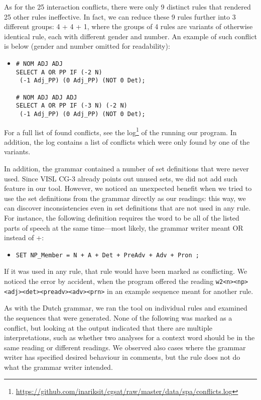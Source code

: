 As for the 25 interaction conflicts, there were only 9 distinct rules that rendered 25 other rules ineffective.
In fact, we can reduce these 9 rules further into 3 different groups: 4 + 4 + 1, where the groups of 4 rules are variants of otherwise identical rule, each with different gender and number.
An example of such conflict is below (gender and number omitted for readability):

\begin{itemize}
\item[] 
\begin{verbatim}
# NOM ADJ ADJ
SELECT A OR PP IF (-2 N) 
 (-1 Adj_PP) (0 Adj_PP) (NOT 0 Det);

# NOM ADJ ADJ ADJ
SELECT A OR PP IF (-3 N) (-2 N) 
 (-1 Adj_PP) (0 Adj_PP) (NOT 0 Det);
\end{verbatim}
\end{itemize}


For a full list of found conflicts, see the log\footnote{\url{https://github.com/inariksit/cgsat/raw/master/data/spa/conflicts.log}} of the running our program. 
In addition, the log contains a list of conflicts which were only found by one of the variants.

In addition, the grammar contained a number of set definitions that were never
used. Since VISL CG-3 already points out unused sets, we did not add such
feature in our tool. However, we noticed an unexpected benefit when
we tried to use the set definitions from the grammar directly as our
readings: this way, we can discover inconsistencies even in
set definitions that are not used in any rule.
For instance, the following definition requires the word to be all of
the listed parts of speech at the same time---most likely, the grammar writer meant 
OR instead of +:
\begin{itemize}
\item[] 
\texttt{SET NP\_Member = N + A + Det + PreAdv + Adv + Pron ;}
\end{itemize}

If it was used in any rule, that rule would have been marked as
conflicting. We noticed the error by accident, when the program
offered the reading \texttt{w2<n><np><adj><det><preadv><adv><prn>}
in an example sequence meant for another rule.


As with the Dutch grammar, we ran the tool on individual rules and
examined the sequences that were generated. None of the following was
marked as a conflict, but looking at the output indicated that there
are multiple interpretations, such as whether two analyses for a
context word should be in the same reading or different readings.
We observed also cases where the grammar writer has specified desired
behaviour in comments, but the rule does not do what the grammar
writer intended. 

